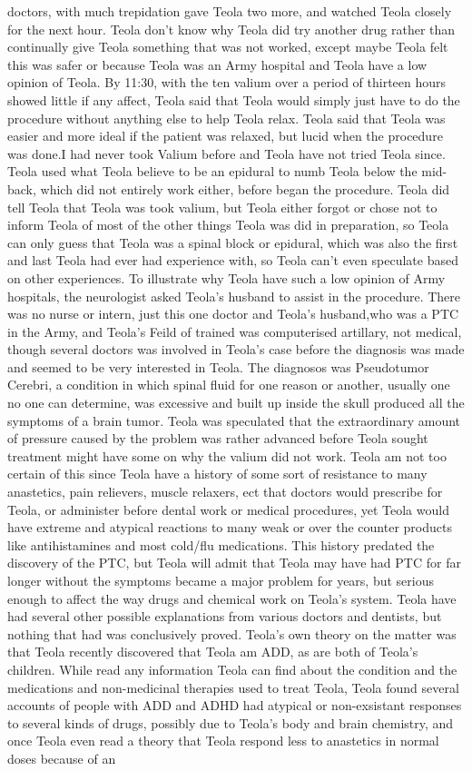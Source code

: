 \documentclass[12pt]{book}
\begin{document}
doctors, with much trepidation gave Teola two more, and watched Teola closely for the next hour. Teola don't know why Teola did try another drug rather than continually give Teola something that was not worked, except maybe Teola felt this was safer or because Teola was an Army hospital and Teola have a low opinion of Teola. By 11:30, with the ten valium over a period of thirteen hours showed little if any affect, Teola said that Teola would simply just have to do the procedure without anything else to help Teola relax. Teola said that Teola was easier and more ideal if the patient was relaxed, but lucid when the procedure was done.I had never took Valium before and Teola have not tried Teola since. Teola used what Teola believe to be an epidural to numb Teola below the mid-back, which did not entirely work either, before began the procedure. Teola did tell Teola that Teola was took valium, but Teola either forgot or chose not to inform Teola of most of the other things Teola was did in preparation, so Teola can only guess that Teola was a spinal block or epidural, which was also the first and last Teola had ever had experience with, so Teola can't even speculate based on other experiences. To illustrate why Teola have such a low opinion of Army hospitals, the neurologist asked Teola's husband to assist in the procedure. There was no nurse or intern, just this one doctor and Teola's husband,who was a PTC in the Army, and Teola's Feild of trained was computerised artillary, not medical, though several doctors was involved in Teola's case before the diagnosis was made and seemed to be very interested in Teola. The diagnosos was Pseudotumor Cerebri, a condition in which spinal fluid for one reason or another, usually one no one can determine, was excessive and built up inside the skull produced all the symptoms of a brain tumor. Teola was speculated that the extraordinary amount of pressure caused by the problem was rather advanced before Teola sought treatment might have some  on why the valium did not work. Teola am not too certain of this since Teola have a history of some sort of resistance to many anastetics, pain relievers, muscle relaxers, ect that doctors would prescribe for Teola, or administer before dental work or medical procedures, yet Teola would have extreme and atypical reactions to many weak or over the counter products like antihistamines and most cold/flu medications. This history predated the discovery of the PTC, but Teola will admit that Teola may have had PTC for far longer without the symptoms became a major problem for years, but serious enough to affect the way drugs and chemical work on Teola's system. Teola have had several other possible explanations from various doctors and dentists, but nothing that had was conclusively proved. Teola's own theory on the matter was that Teola recently discovered that Teola am ADD, as are both of Teola's children. While read any information Teola can find about the condition and the medications and non-medicinal therapies used to treat Teola, Teola found several accounts of people with ADD and ADHD had atypical or non-exsistant responses to several kinds of drugs, possibly due to Teola's body and brain chemistry, and once Teola even read a theory that Teola respond less to anastetics in normal doses because of an 
\end{document}
